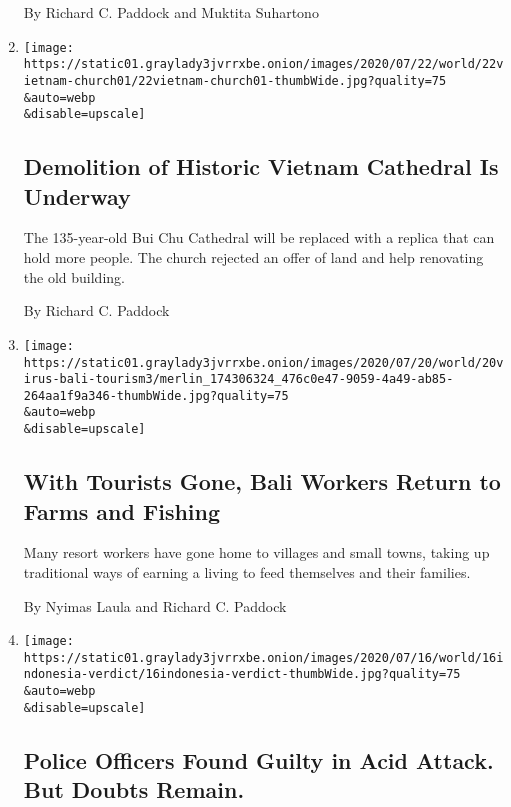 \begin{enumerate}
  By Richard C. Paddock and Muktita Suhartono
\item
  \href{/2020/07/22/world/asia/biu-chu-cathedral-vietnam-demolish.html}{}

  \texttt{[image: https://static01.graylady3jvrrxbe.onion/images/2020/07/22/world/22vietnam-church01/22vietnam-church01-thumbWide.jpg?quality=75\\\&auto=webp\\\&disable=upscale]}

  \hypertarget{demolition-of-historic-vietnam-cathedral-is-underway}{%
  \subsection{Demolition of Historic Vietnam Cathedral Is
  Underway}\label{demolition-of-historic-vietnam-cathedral-is-underway}}

  The 135-year-old Bui Chu Cathedral will be replaced with a replica
  that can hold more people. The church rejected an offer of land and
  help renovating the old building.

  By Richard C. Paddock
\item
  \href{/2020/07/20/world/asia/bali-tourism-coronavirus.html}{}

  \texttt{[image: https://static01.graylady3jvrrxbe.onion/images/2020/07/20/world/20virus-bali-tourism3/merlin\_174306324\_476c0e47-9059-4a49-ab85-264aa1f9a346-thumbWide.jpg?quality=75\\\&auto=webp\\\&disable=upscale]}

  \hypertarget{with-tourists-gone-bali-workers-return-to-farms-and-fishing}{%
  \subsection{With Tourists Gone, Bali Workers Return to Farms and
  Fishing}\label{with-tourists-gone-bali-workers-return-to-farms-and-fishing}}

  Many resort workers have gone home to villages and small towns, taking
  up traditional ways of earning a living to feed themselves and their
  families.

  By Nyimas Laula and Richard C. Paddock
\item
  \href{/2020/07/16/world/asia/indonesia-investigator-acid-attack.html}{}

  \texttt{[image: https://static01.graylady3jvrrxbe.onion/images/2020/07/16/world/16indonesia-verdict/16indonesia-verdict-thumbWide.jpg?quality=75\\\&auto=webp\\\&disable=upscale]}

  \hypertarget{police-officers-found-guilty-in-acid-attack-but-doubts-remain}{%
  \subsection{Police Officers Found Guilty in Acid Attack. But Doubts
  Remain.}\label{police-officers-found-guilty-in-acid-attack-but-doubts-remain}}


\end{enumerate}

